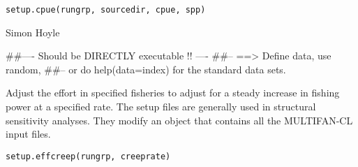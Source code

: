 \documentclass[a4paper]{book}
\begin{document}
%
\begin{Usage}
\begin{verbatim}
setup.cpue(rungrp, sourcedir, cpue, spp)
\end{verbatim}
\end{Usage}
%
\begin{Arguments}
\begin{ldescription}
\item[\code{rungrp}] 


\item[\code{sourcedir}] 


\item[\code{cpue}] 


\item[\code{spp}] 


\end{ldescription}
\end{Arguments}
%
\begin{Author}\relax

Simon Hoyle
\end{Author}
%
\begin{Examples}
\begin{ExampleCode}
##---- Should be DIRECTLY executable !! ----
##-- ==>  Define data, use random,
##--	or do  help(data=index)  for the standard data sets.

\end{ExampleCode}
\end{Examples}
%
\begin{Description}\relax

Adjust the effort in specified fisheries to adjust for a steady increase in fishing power at a specified rate. 
The setup files are generally used in structural sensitivity analyses. They modify an object that contains all the MULTIFAN-CL input files. 
\end{Description}
%
\begin{Usage}
\begin{verbatim}
setup.effcreep(rungrp, creeprate)
\end{verbatim}
\end{Usage}
%
\begin{Arguments}
\begin{ldescription}
\item[\code{rungrp}] 


\item[\code{creeprate}] 


\end{ldescription}
\end{Arguments}
\end{document}
